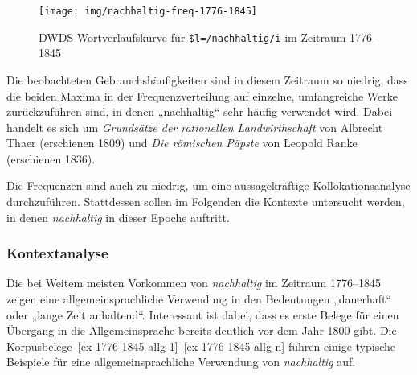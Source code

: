 \documentclass[
    german,
    a4paper,%
    12pt,%
    oneside,%
    toc=bibliography,
    final,
]{scrartcl}
\begin{document}
\begin{figure}[h!]
	\centering
	
	\texttt{[image: img/nachhaltig-freq-1776-1845]}
	\caption[corpus-size]{DWDS-Wortverlaufskurve für \lstinline|$l=/nachhaltig/i| im Zeitraum 1776–1845\protect\footnotemark}
	\label{fig:nachhaltig-freq-1776-1845}
\end{figure}

Die beobachteten Gebrauchshäufigkeiten sind in diesem Zeitraum so niedrig, dass die beiden Maxima in der Frequenzverteilung auf einzelne, umfangreiche Werke zurückzuführen sind, in denen „nachhaltig“ sehr häufig verwendet wird. Dabei handelt es sich um \textit{Grundsätze der rationellen Landwirthschaft} von Albrecht Thaer (erschienen 1809) und \textit{Die römischen Päpste} von Leopold Ranke (erschienen 1836).

Die Frequenzen sind auch zu niedrig, um eine aussagekräftige Kollokationsanalyse durchzuführen. Stattdessen sollen im Folgenden die Kontexte untersucht werden, in denen \textit{nachhaltig} in dieser Epoche auftritt.

\subsubsection{Kontextanalyse}

Die bei Weitem meisten Vorkommen von \textit{nachhaltig} im Zeitraum 1776–1845 zeigen eine allgemeinsprachliche Verwendung in den Bedeutungen „dauerhaft“ oder „lange Zeit anhaltend“. Interessant ist dabei, dass es erste Belege für einen Übergang in die Allgemeinsprache bereits deutlich vor dem Jahr 1800 gibt. Die Korpusbelege~\ref{ex-1776-1845-allg-1}–\ref{ex-1776-1845-allg-n} führen einige typische Beispiele für eine allgemeinsprachliche Verwendung von \textit{nachhaltig} auf.
\end{document}
